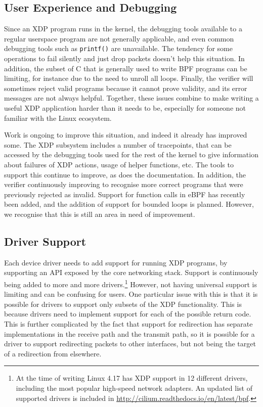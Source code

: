 \documentclass[10pt,sigconf]{acmart}
\begin{document}
\subsection{User Experience and Debugging}
\label{sec:user-exper-debugg}
Since an XDP program runs in the kernel, the debugging tools available to a
regular userspace program are not generally applicable, and even common
debugging tools such as \texttt{printf()} are unavailable. The tendency for some
operations to fail silently and just drop packets doesn't help this situation.
In addition, the subset of C that is generally used to write BPF programs can be
limiting, for instance due to the need to unroll all loops. Finally, the
verifier will sometimes reject valid programs because it cannot prove validity,
and its error messages are not always helpful. Together, these issues combine to
make writing a useful XDP application harder than it needs to be, especially for
someone not familiar with the Linux ecosystem.

Work is ongoing to improve this situation, and indeed it already has improved
some. The XDP subsystem includes a number of tracepoints, that can be accessed
by the debugging tools used for the rest of the kernel to give information about
failures of XDP actions, usage of helper functions, etc. The tools to support
this continue to improve, as does the documentation. In addition, the verifier
continuously improving to recognise more correct programs that were previously
rejected as invalid. Support for function calls in eBPF has recently been added,
and the addition of support for bounded loops is planned. However, we recognise
that this is still an area in need of improvement.

\subsection{Driver Support}
\label{sec:driver-support}
Each device driver needs to add support for running XDP programs, by supporting
an API exposed by the core networking stack. Support is continuously being added
to more and more drivers.\footnote{At the time of writing Linux 4.17 has XDP
  support in 12 different drivers, including the most popular high-speed network
  adapters. An updated list of supported drivers is included in
  \url{http://cilium.readthedocs.io/en/latest/bpf}.} However, not having
universal support is limiting and can be confusing for users. One particular
issue with this is that it is possible for drivers to support only subsets of
the XDP functionality. This is because drivers need to implement support for
each of the possible return code. This is further complicated by the fact that
support for redirection has separate implementations in the receive path and the
transmit path, so it is possible for a driver to support redirecting packets to
other interfaces, but not being the target of a redirection from elsewhere.
\end{document}
